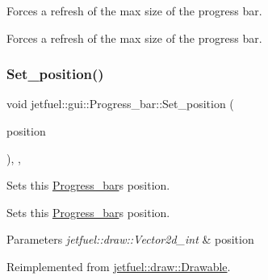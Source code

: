 Forces a refresh of the max size of the progress bar. 

Forces a refresh of the max size of the progress bar. \mbox{\label{classjetfuel_1_1gui_1_1Progress__bar_a5f52369cccd805274805abf5913535df}} 
\subsubsection{\texorpdfstring{Set\+\_\+position()}{Set\_position()}}
{\footnotesize\ttfamily void jetfuel\+::gui\+::\+Progress\+\_\+bar\+::\+Set\+\_\+position (\begin{DoxyParamCaption}\item[{\hyperlink{classjetfuel_1_1draw_1_1Vector2d}{jetfuel\+::draw\+::\+Vector2d\+\_\+int}}]{position }\end{DoxyParamCaption})\hspace{0.3cm}{\ttfamily [inline]}, {\ttfamily [override]}, {\ttfamily [virtual]}}



Sets this \hyperlink{classjetfuel_1_1gui_1_1Progress__bar}{Progress\+\_\+bar}\textquotesingle{}s position. 

Sets this \hyperlink{classjetfuel_1_1gui_1_1Progress__bar}{Progress\+\_\+bar}\textquotesingle{}s position.


\begin{DoxyParams}{Parameters}
{\em jetfuel\+::draw\+::\+Vector2d\+\_\+int} & position \\
\hline
\end{DoxyParams}


Reimplemented from \hyperlink{classjetfuel_1_1draw_1_1Drawable_afdd035afe40c706459a6c9df813bcce6}{jetfuel\+::draw\+::\+Drawable}.

\mbox{\label{classjetfuel_1_1gui_1_1Progress__bar_aef1b768b22c17ce9dab2fd12a9370262}} 
